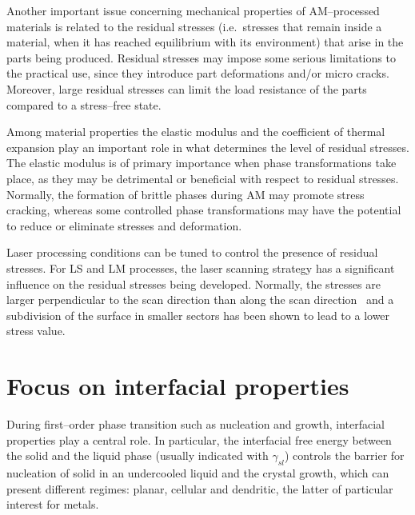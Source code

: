 Another important issue concerning mechanical properties of AM--processed materials is related to the residual stresses (i.e.\ stresses that remain inside a material, when it has reached equilibrium with its environment) that arise in the parts being produced. Residual stresses may impose some serious limitations to the practical use, since they introduce part deformations and/or micro cracks. Moreover, large residual stresses can limit the load resistance of the parts compared to a stress--free state.


Among material properties the elastic modulus and the coefficient of thermal expansion play an important role in what determines the level of residual stresses.
The elastic modulus is of primary importance when phase transformations take place, as they may be detrimental or beneficial with respect to residual stresses. Normally, the formation of brittle phases during AM may promote stress cracking, whereas some controlled phase transformations may have the potential to reduce or eliminate stresses and deformation.

Laser processing conditions can be tuned to control the presence of residual stresses. For LS and LM processes, the laser scanning strategy has a significant influence on the residual stresses being developed. Normally, the stresses are larger perpendicular to the scan direction than along the scan direction~\cite{Simchi2003:GuREVIEW173}  and a  subdivision of the surface in smaller sectors has been shown to lead to a lower stress value.




\section{Focus on interfacial properties}
During first--order phase transition such as nucleation and growth, interfacial properties play a central role. In particular, the interfacial free energy between the solid and the liquid phase (usually indicated with $\gamma_{sl}$) controls the barrier for nucleation of solid in an undercooled liquid and the crystal growth, which can present different regimes: planar, cellular and dendritic, the latter of particular interest for metals.

